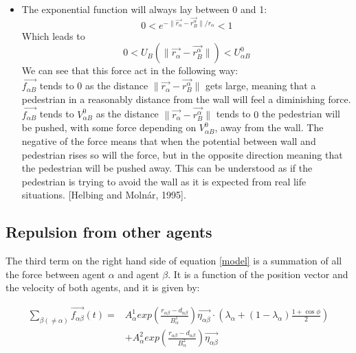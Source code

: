 \begin{itemize}
\item The exponential function will always lay between 0 and 1:
\begin{equation}
0 < e^{ -\| \vec{r_{\alpha}} - \vec{r_{B}^{\alpha}} \| /r_\alpha} < 1
\end{equation}
Which leads to
\begin{equation}
0< U_{B} \left( \| \vec{r_{\alpha}} - \vec{r_{B}^{\alpha}} \| \right) < U^0_{\alpha B}
\end{equation}
We can see that this force act in the following way:\\
$\vec{f_{\alpha B}}$ tends to 0 as the distance $ \| \vec{r_{\alpha}} - \vec{r_{B}^{\alpha}} \|$ gets large, meaning that a pedestrian in a reasonably distance from the wall will feel a diminishing force. $\vec{f_{\alpha B}}$ tends to $V^0_{\alpha B}$ as the distance $ \| \vec{r_{\alpha}} - \vec{r_{B}^{\alpha}} \|$ tends to $0$ the pedestrian will be pushed, with some force depending on $V^0_{\alpha B}$, away from the wall. 
The negative of the force means that when the potential between wall and pedestrian rises so will the force, but in the opposite direction meaning that the pedestrian will be pushed away. This can be understood as if the pedestrian is trying to avoid the wall as it is expected from real life situations.
 [Helbing and Molnár, 1995]. %
\end{itemize}


\subsection{Repulsion from other agents}
The third term on the right hand side of equation \eqref{model} is a summation of all the 
force between agent $\alpha$ and agent $\beta$. It is a function of the position vector and the velocity of 
both agents, and it is given by:

\begin{equation}
	\begin{split}
    \sum_{\beta \left( \neq \alpha \right)}
        \vec{f_{\alpha \beta }}\left( t \right) = &
        A_{\alpha}^{1} exp \left(
            \frac{ r_{\alpha \beta} - d_{\alpha \beta }}
                 {B_{\alpha}^1}
        \right)
    \vec{\eta_{\alpha \beta}} \cdot
    \left(
        \lambda_{\alpha} + \left(
            1 - \lambda_{\alpha}
        \right)
		\frac{1+\cos{\phi}}{2}
    \right) \\
& +A_{\alpha}^{2} exp\left(
        \frac{r_{\alpha \beta} - d_{\alpha \beta}}
             {B_{\alpha}^{2}}
    \right)
    \vec{\eta_{\alpha \beta}}
    \label{agentinteraction}
\end{split}
\end{equation}

